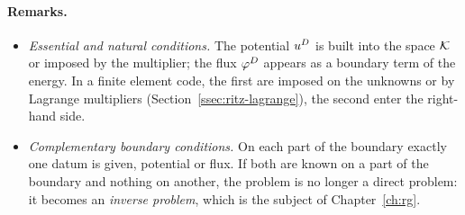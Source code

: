 \paragraph{Remarks.}
\begin{itemize}
  \item \emph{Essential and natural conditions.} The potential $u^{D}$ is built
  into the space $\mathcal{K}$ or imposed by the multiplier; the flux $\varphi^{D}$ appears as
  a boundary term of the energy. In a finite element code, the first are
  imposed on the unknowns or by Lagrange multipliers
  (Section~\ref{ssec:ritz-lagrange}), the second enter the right-hand side.
  \item \emph{Complementary boundary conditions.} On each part of the
  boundary exactly one datum is given, potential or flux. If both are known
  on a part of the boundary and nothing on another, the problem is no longer
  a direct problem: it becomes an \emph{inverse problem}, which is the subject
  of Chapter~\ref{ch:rg}.
\end{itemize}

